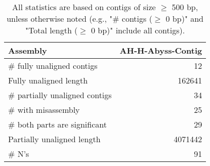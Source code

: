 \documentclass[12pt,a4paper]{article}
\begin{document}
\begin{table}[ht]
\begin{center}
\caption{All statistics are based on contigs of size $\geq$ 500 bp, unless otherwise noted (e.g., "\# contigs ($\geq$ 0 bp)" and "Total length ($\geq$ 0 bp)" include all contigs).}
\begin{tabular}{|l*{1}{|r}|}
\hline
Assembly & AH-H-Abyss-Contig \\ \hline
\# fully unaligned contigs & 12 \\ \hline
Fully unaligned length & 162641 \\ \hline
\# partially unaligned contigs & 34 \\ \hline
\hspace{5mm}\# with misassembly & 25 \\ \hline
\hspace{5mm}\# both parts are significant & 29 \\ \hline
Partially unaligned length & 4071442 \\ \hline
\# N's & 91 \\ \hline
\end{tabular}
\end{center}
\end{table}
\end{document}
